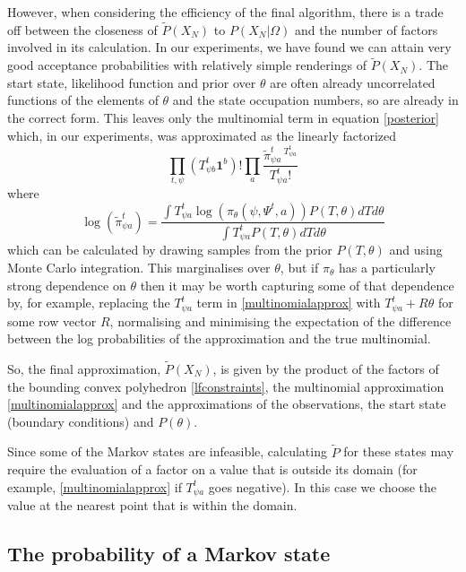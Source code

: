 \documentclass{article}
\begin{document}
However, when considering the efficiency of the final algorithm, there is a trade off between the closeness of $\tilde{P}(X_N)$ to $P(X_N|\Omega)$ and the number of factors involved in its calculation. In our experiments, we have found we can attain very good acceptance probabilities with relatively simple renderings of $\tilde{P}(X_N)$. The start state, likelihood function and prior over $\theta$ are often already uncorrelated functions of the elements of $\theta$ and the state occupation numbers, so are already in the correct form. This leaves only the multinomial term in equation \eqref{posterior} which, in our experiments, was approximated as the linearly factorized
\begin{equation}
\prod_{t, \psi}\left(T^t_{\psi b}\mathbf{1}^b\right)! \prod_a \frac{\tilde{\pi}^t_{\psi a}\,^{T^t_{\psi a}}}{T^t_{\psi a}!}
\label{multinomialapprox}
\end{equation}
where
\[
\log(\tilde{\pi}^t_{\psi a}) = \frac{\int T^t_{\psi a}\log\left(\pi_\theta(\psi, \Psi^t, a)\right)P(T,\theta) dT d\theta}{\int T^t_{\psi a}P(T,\theta) dT d\theta}
\]
which can be calculated by drawing samples from the prior $P(T,\theta)$ and using Monte Carlo integration. This marginalises over $\theta$, but if $\pi_\theta$ has a particularly strong dependence on $\theta$ then it may be worth capturing some of that dependence by, for example, replacing the $T^t_{\psi a}$ term in \eqref{multinomialapprox} with $T^t_{\psi a} + R\theta$ for some row vector $R$, normalising and minimising the expectation of the difference between the log probabilities of the approximation and the true multinomial.

So, the final approximation, $\tilde{P}(X_N)$, is given by the product of the factors of the bounding convex polyhedron \eqref{lfconstraints}, the multinomial approximation \eqref{multinomialapprox} and the approximations of the observations, the start state (boundary conditions) and $P(\theta)$.

Since some of the Markov states are infeasible, calculating $\tilde{P}$ for these states may require the evaluation of a factor on a value that is outside its domain (for example, \eqref{multinomialapprox} if $T^t_{\psi a}$ goes negative). In this case we choose the value at the nearest point that is within the domain.


\subsection{The probability of a Markov state}
\end{document}
